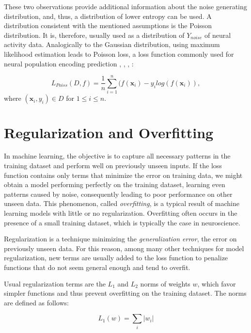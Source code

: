 These two observations provide additional information about the noise generating distribution, and, thus, a distribution of lower entropy can be used. A distribution consistent with the mentioned assumptions is the Poisson distribution. It is, therefore, usually used as a distribution of $Y_{noise}$ of neural activity data. Analogically to the Gaussian distribution, using maximum likelihood estimation leads to Poisson loss, a loss function commonly used for neural population encoding prediction \citep{cadena2019deep}, \citep{klindt2017neural}, \citep{sinz2018stimulus}, \citep{lurz2021generalization}:

\begin{defn}\label{def01:6}
	\begin{equation}
		L_{Poiss}(D, f) = \frac{1}{n} \sum_{i=1}^n (f(\textbf{x}_i) - y_i log(f(\textbf{x}_i)),
	\end{equation}
	where $(\textbf{x}_i, y_i) \in D$ for $1 \leq i \leq n$.
\end{defn}


\section{Regularization and Overfitting}

In machine learning, the objective is to capture all necessary patterns in the training dataset and perform well on previously unseen inputs. If the loss function contains only terms that minimize the error on training data, we might obtain a model performing perfectly on the training dataset, learning even patterns caused by noise, consequently leading to poor performance on other unseen data. This phenomenon, called \emph{overfitting}, is a typical result of machine learning models with little or no regularization. Overfitting often occurs in the presence of a small training dataset, which is typically the case in neuroscience.


Regularization is a technique minimizing the \emph{generalization error}, the error on previously unseen data. For this reason, among many other techniques for model regularization, new terms are usually added to the loss function to penalize functions that do not seem general enough and tend to overfit.

Usual regularization terms are the $L_1$ and $L_2$ norms of weights $w$, which favor simpler functions and thus prevent overfitting on the training dataset. The norms are defined as follows:

\begin{equation}
L_1(w) = \sum_i |w_i|
\end{equation}

